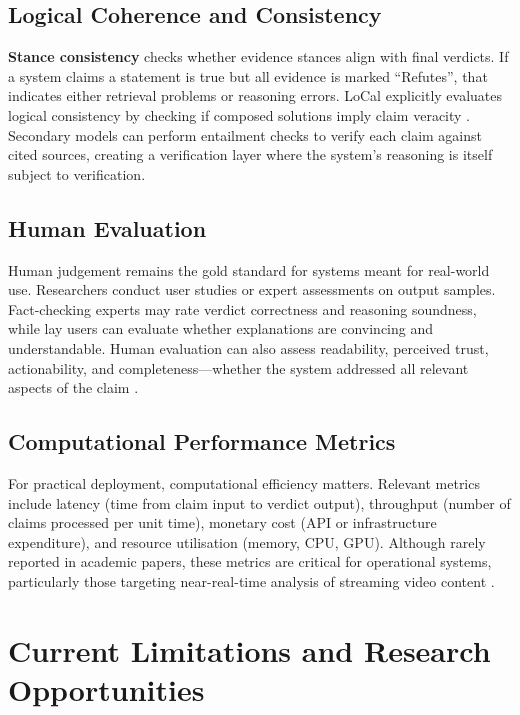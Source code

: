 \documentclass[12pt,a4paper]{article}
\begin{document}
\subsection{Logical Coherence and Consistency}

\textbf{Stance consistency} checks whether evidence stances align with final verdicts. If a system claims a statement is true but all evidence is marked ``Refutes'', that indicates either retrieval problems or reasoning errors. LoCal explicitly evaluates logical consistency by checking if composed solutions imply claim veracity \citep{chen2024local}. Secondary models can perform entailment checks to verify each claim against cited sources, creating a verification layer where the system's reasoning is itself subject to verification.

\subsection{Human Evaluation}

Human judgement remains the gold standard for systems meant for real-world use. Researchers conduct user studies or expert assessments on output samples. Fact-checking experts may rate verdict correctness and reasoning soundness, while lay users can evaluate whether explanations are convincing and understandable. Human evaluation can also assess readability, perceived trust, actionability, and completeness—whether the system addressed all relevant aspects of the claim \citep{ma2025guided, wardle2017information}.

\subsection{Computational Performance Metrics}

For practical deployment, computational efficiency matters. Relevant metrics include latency (time from claim input to verdict output), throughput (number of claims processed per unit time), monetary cost (API or infrastructure expenditure), and resource utilisation (memory, CPU, GPU). Although rarely reported in academic papers, these metrics are critical for operational systems, particularly those targeting near-real-time analysis of streaming video content \citep{hysonlab2025factagent, tian2024webagents}.

\section{Current Limitations and Research Opportunities}
\end{document}
